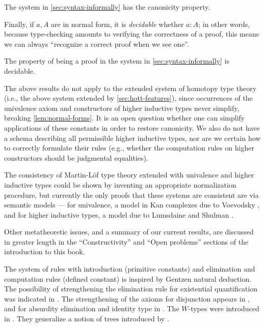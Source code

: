 \begin{cor}
 The system in \cref{sec:syntax-informally} has the canonicity property.
\end{cor}

Finally, if $a,A$ are in normal form, it is \emph{decidable} whether $a:A$; in
other words, because type-checking amounts to verifying the correctness of a
proof, this means we can always ``recognize a correct proof when we see one''.

\begin{cor}
The property of being a proof in the system in \cref{sec:syntax-informally} is decidable.
\end{cor}

\mentalpause

The above results do not apply to the extended system of homotopy type
theory (i.e., the above system extended by \cref{sec:hott-features}), since
occurrences of the univalence axiom and constructors of higher inductive types
never simplify, breaking \cref{lem:normal-forms}. It is an open question
whether one can simplify applications of these constants in order to restore
canonicity. We also do not have a schema describing all permissible higher
inductive types, nor are we certain how to correctly formulate their rules
(e.g., whether the computation rules on higher constructors should be judgmental
equalities).

The consistency of Martin-L\"{o}f type theory extended with univalence and higher
inductive types could be shown by inventing an appropriate normalization procedure, but currently
the only proofs that these systems are consistent are via semantic models --- for
univalence, a model in Kan complexes due to Voevodsky \cite{klv:ssetmodel}, and
for higher inductive types, a model due to Lumsdaine and Shulman \cite{ls:hits}.

Other metatheoretic issues, and a summary of our current results, are discussed
in greater length in the ``Constructivity'' and ``Open problems'' sections of
the introduction to this book.

%

\sectionNotes\label{subsec:general-remarks}


The system of rules with introduction (primitive constants) and elimination
and computation rules (defined constant) is inspired by Gentzen natural
deduction. The possibility of strengthening the elimination rule for
existential quantification was indicated in \cite{howard:pat}. The
strengthening of the axioms for disjunction appears in \cite{Martin-Lof-1972},
and for absurdity elimination and identity type in \cite{Martin-Lof-1973}. The
$W$-types were introduced in \cite{Martin-Lof-1979}. They generalize a notion
of trees introduced by \cite{Tait-1968}.
%

